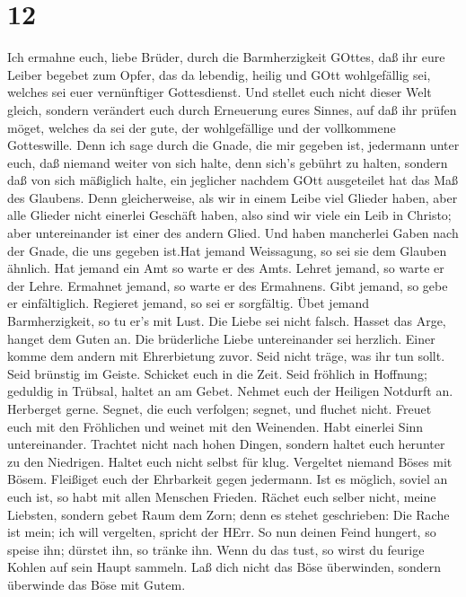 \hypertarget{section-11}{%
\section{12}\label{section-11}}

 Ich ermahne euch, liebe Brüder, durch die Barmherzigkeit
GOttes, daß ihr eure Leiber begebet zum Opfer, das da lebendig, heilig
und GOtt wohlgefällig sei, welches sei euer vernünftiger Gottesdienst.
 Und stellet euch nicht dieser Welt gleich, sondern
verändert euch durch Erneuerung eures Sinnes, auf daß ihr prüfen möget,
welches da sei der gute, der wohlgefällige und der vollkommene
Gotteswille.  Denn ich sage durch die Gnade, die mir gegeben
ist, jedermann unter euch, daß niemand weiter von sich halte, denn
sich's gebührt zu halten, sondern daß von sich mäßiglich halte, ein
jeglicher nachdem GOtt ausgeteilet hat das Maß des Glaubens.
 Denn gleicherweise, als wir in einem Leibe viel Glieder
haben, aber alle Glieder nicht einerlei Geschäft haben, 
also sind wir viele ein Leib in Christo; aber untereinander ist einer
des andern Glied.  Und haben mancherlei Gaben nach der
Gnade, die uns gegeben ist.Hat jemand Weissagung, so sei sie dem Glauben
ähnlich.  Hat jemand ein Amt so warte er des Amts. Lehret
jemand, so warte er der Lehre.  Ermahnet jemand, so warte er
des Ermahnens. Gibt jemand, so gebe er einfältiglich. Regieret jemand,
so sei er sorgfältig. Übet jemand Barmherzigkeit, so tu er's mit Lust.
 Die Liebe sei nicht falsch. Hasset das Arge, hanget dem
Guten an.  Die brüderliche Liebe untereinander sei
herzlich. Einer komme dem andern mit Ehrerbietung zuvor. 
Seid nicht träge, was ihr tun sollt. Seid brünstig im Geiste. Schicket
euch in die Zeit.  Seid fröhlich in Hoffnung; geduldig in
Trübsal, haltet an am Gebet.  Nehmet euch der Heiligen
Notdurft an. Herberget gerne.  Segnet, die euch verfolgen;
segnet, und fluchet nicht.  Freuet euch mit den Fröhlichen
und weinet mit den Weinenden.  Habt einerlei Sinn
untereinander. Trachtet nicht nach hohen Dingen, sondern haltet euch
herunter zu den Niedrigen.  Haltet euch nicht selbst für
klug. Vergeltet niemand Böses mit Bösem. Fleißiget euch der Ehrbarkeit
gegen jedermann.  Ist es möglich, soviel an euch ist, so
habt mit allen Menschen Frieden.  Rächet euch selber nicht,
meine Liebsten, sondern gebet Raum dem Zorn; denn es stehet geschrieben:
Die Rache ist mein; ich will vergelten, spricht der HErr. 
So nun deinen Feind hungert, so speise ihn; dürstet ihn, so tränke ihn.
Wenn du das tust, so wirst du feurige Kohlen auf sein Haupt sammeln.
 Laß dich nicht das Böse überwinden, sondern überwinde das
Böse mit Gutem.

